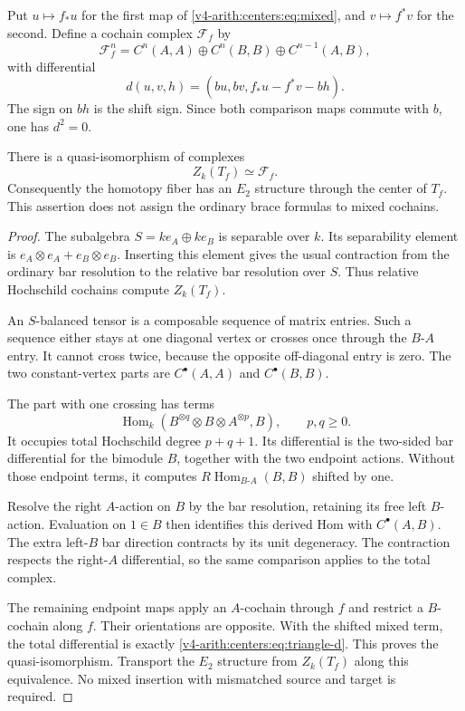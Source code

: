 Put $u\mapsto f_*u$ for the first map of
\eqref{v4-arith:centers:eq:mixed}, and
$v\mapsto f^*v$ for the second. Define a cochain
complex $\mathcal F_f$ by
\[
 \mathcal F_f^n=C^n(A,A)\oplus C^n(B,B)
                    \oplus C^{n-1}(A,B),
\]
with differential
\begin{equation}\label{v4-arith:centers:eq:triangle-d}
 d(u,v,h)=(bu,bv,f_*u-f^*v-bh).
\end{equation}
The sign on $bh$ is the shift sign. Since both
comparison maps commute with $b$, one has $d^2=0$.

\begin{theorem}
\label{v4-arith:centers:thm:triangle}
There is a quasi-isomorphism of complexes
\[
 Z_k(T_f)\simeq\mathcal F_f.
\]
Consequently the homotopy fiber has an $E_2$ structure
through the center of $T_f$. This assertion does not
assign the ordinary brace formulas to mixed cochains.
\end{theorem}

\begin{proof}
The subalgebra $S=ke_A\oplus ke_B$ is separable over
$k$. Its separability element is
$e_A\otimes e_A+e_B\otimes e_B$.
Inserting this element gives the usual contraction
from the ordinary bar resolution to the relative
bar resolution over $S$.
Thus relative Hochschild cochains compute $Z_k(T_f)$.

An $S$-balanced tensor is a composable sequence of
matrix entries. Such a sequence either stays at one
diagonal vertex or crosses once through the
$B$-$A$ entry. It cannot cross twice, because the
opposite off-diagonal entry is zero. The two
constant-vertex parts are $C^\bullet(A,A)$ and
$C^\bullet(B,B)$.

The part with one crossing has terms
\[
 \operatorname{Hom}_k
       (B^{\otimes q}\otimes B\otimes A^{\otimes p},B),
 \qquad p,q\geq0.
\]
It occupies total Hochschild degree $p+q+1$.
Its differential is the two-sided bar differential
for the bimodule $B$, together with the two endpoint
actions. Without those endpoint terms, it computes
$R\operatorname{Hom}_{B\text{-}A}(B,B)$ shifted by
one.

Resolve the right $A$-action on $B$ by the bar
resolution, retaining its free left $B$-action.
Evaluation on $1\in B$ then identifies this derived
Hom with $C^\bullet(A,B)$.
The extra left-$B$ bar direction contracts by its
unit degeneracy. The contraction respects the
right-$A$ differential, so the same comparison
applies to the total complex.

The remaining endpoint maps apply an $A$-cochain
through $f$ and restrict a $B$-cochain along $f$.
Their orientations are opposite. With the shifted
mixed term, the total differential is exactly
\eqref{v4-arith:centers:eq:triangle-d}.
This proves the quasi-isomorphism. Transport the
$E_2$ structure from $Z_k(T_f)$ along this
equivalence. No mixed insertion with mismatched
source and target is required.
\end{proof}

